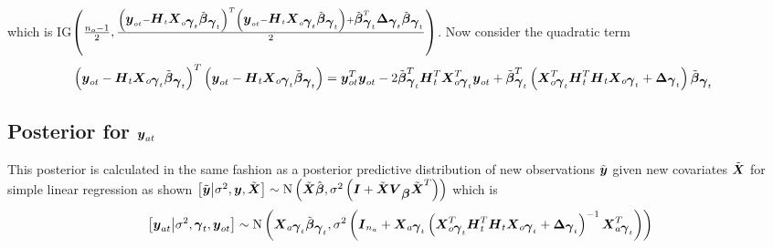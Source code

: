 \documentclass[fleqn]{article}
\def\bm#1{\mbox{\boldmath $#1$}}
\begin{document}
%
which is IG$\left( \frac{n_o - 1} {2}, \frac{ \left( \bm{y}_{o t} - \bm{H}_t \bm{X}_{o \bm{\gamma}_t} \tilde{\bm{\beta}}_{\bm{\gamma}_t} \right)^T \left( \bm{y}_{o t} - \bm{H}_t \bm{X}_{o \bm{\gamma}_t} \tilde{\bm{\beta}}_{\bm{\gamma}_t} \right) + \tilde{\bm{\beta}}_{\bm{\gamma}_t}^T \bm{\Delta}_{\bm{\gamma}_t} \tilde{\bm{\beta}}_{\bm{\gamma}_t} } {2} \right)$. Now consider the quadratic term 
%
\begin{align*}
%
\left( \bm{y}_{o t} - \bm{H}_t \bm{X}_{o \bm{\gamma}_t} \tilde{\bm{\beta}}_{\bm{\gamma}_t} \right)^T \left( \bm{y}_{o t} - \bm{H}_t \bm{X}_{o \bm{\gamma}_t} \tilde{\bm{\beta}}_{\bm{\gamma}_t} \right) & = \bm{y}_{o t}^T \bm{y}_{o t} - 2 \tilde{\bm{\beta}}_{\bm{\gamma}_t}^T \bm{H}_t^T \bm{X}_{o \bm{\gamma}_t}^T \bm{y}_{o t} + \tilde{\bm{\beta}}_{\bm{\gamma}_t}^T \left( \bm{X}_{o \bm{\gamma}_t}^T \bm{H}_t^T \bm{H}_t \bm{X}_{o \bm{\gamma}_t} + \bm{\Delta}_{\bm{\gamma}_t} \right) \tilde{\bm{\beta}}_{\bm{\gamma}_t}
%
\end{align*}
%
\subsection{Posterior for $\bm{y}_{a t}$}
%
This posterior is calculated in the same fashion as a posterior predictive distribution of new observations $\tilde{\bm{y}}$ given new covariates $\tilde{\bm{X}}$ for simple linear regression as shown $\left[ \tilde{\bm{y}} \middle| \sigma^2, \bm{y}, \tilde{\bm{X}} \right] \sim \mbox{N}\left( \tilde{\bm{X}} \hat{\bm{\beta}}, \sigma^2 \left( \bm{I} + \tilde{\bm{X}} \bm{V}_{\bm{\beta}} \tilde{\bm{X}}^T \right) \right)
$
which is  
%
\begin{align*}
%
\left[ \bm{y}_{a t} \middle| \sigma^2, \bm{\gamma}_t, \bm{y}_{o t} \right] \sim \mbox{N}\left( \bm{X}_{a \bm{\gamma}_t} \tilde{\bm{\beta}}_{\bm{\gamma}_t}, \sigma^2 \left( \bm{I}_{n_a} + \bm{X}_{a \bm{\gamma}_t} \left( \bm{X}_{o \bm{\gamma}_t}^T \bm{H}_t^T \bm{H}_t \bm{X}_{o \bm{\gamma}_t} + \bm{\Delta}_{\bm{\gamma}_t} \right)^{ - 1} \bm{X}_{a \bm{\gamma}_t}^T \right) \right)
%
\end{align*}
\end{document}
